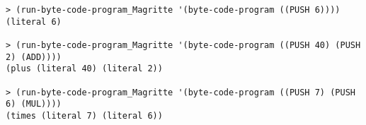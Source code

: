 \begin{verbatim}
> (run-byte-code-program_Magritte '(byte-code-program ((PUSH 6))))
(literal 6)

> (run-byte-code-program_Magritte '(byte-code-program ((PUSH 40) (PUSH 2) (ADD))))
(plus (literal 40) (literal 2))

> (run-byte-code-program_Magritte '(byte-code-program ((PUSH 7) (PUSH 6) (MUL))))
(times (literal 7) (literal 6))
\end{verbatim}